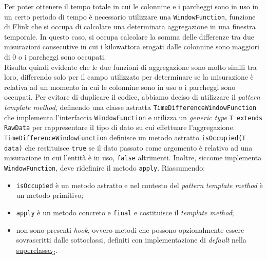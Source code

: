 Per poter ottenere il tempo totale in cui le colonnine e i parcheggi sono in uso in un certo periodo di tempo è necessario utilizzare una \texttt{WindowFunction},
funzione di Flink che si occupa di calcolare una determinata aggregazione in una finestra temporale. In questo caso, si occupa calcolare la somma delle differenze
tra due misurazioni consecutive in cui i kilowattora erogati dalle colonnine sono maggiori di 0 o i parcheggi sono occupati.\\
Risulta quindi evidente che le due funzioni di aggregazione sono molto simili tra loro, differendo solo per il campo utilizzato per determinare se la misurazione
è relativa ad un momento in cui le colonnine sono in uso o i parcheggi sono occupati. Per evitare di duplicare il codice, abbiamo deciso di utilizzare il \textit{pattern}
\textit{template method}, definendo una classe astratta \texttt{TimeDifferenceWindowFunction} che implementa l'interfaccia \texttt{WindowFunction}
e utilizza un \textit{generic type} \texttt{T extends RawData} per rappresentare il tipo di dato su cui effettuare l'aggregazione.
\texttt{TimeDifferenceWindowFunction} definisce un metodo astratto \texttt{isOccupied(T data)} che restituisce \texttt{true} se il dato passato come argomento è relativo ad una misurazione in cui
l'entità è in uso, \texttt{false} altrimenti. Inoltre, siccome implementa \texttt{WindowFunction}, deve ridefinire il metodo \texttt{apply}.
Riassumendo:
\begin{itemize}
	\item \texttt{isOccupied} è un metodo astratto e nel contesto del \textit{pattern} \textit{template method} è un metodo primitivo;
	\item \texttt{apply} è un metodo concreto e \texttt{final} e costituisce il \textit{template method};
	\item non sono presenti \textit{hook}, ovvero metodi che possono opzionalmente essere sovrascritti dalle sottoclassi, definiti con implementazione di \textit{default} nella \href{https://7last.github.io/docs/pb/documentazione-interna/glossario\#superclasse}{superclasse\textsubscript{G}}.
\end{itemize}

